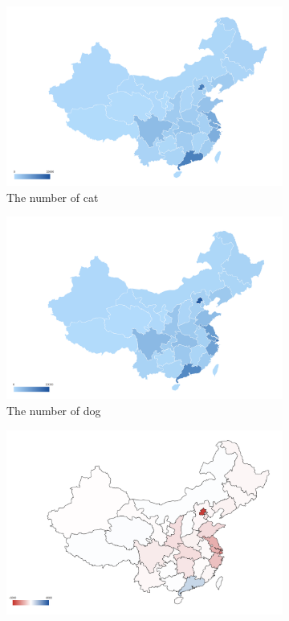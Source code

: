 \documentclass[12pt]{article}
\begin{document}
\begin{figure}[h!]
  \centering
  \begin{subfigure}[b]{0.3\linewidth}
    \includegraphics[width=\linewidth]{../Province/Cat_Province.png}
    \caption{The number of cat}
  \end{subfigure}
  \begin{subfigure}[b]{0.3\linewidth}
    \includegraphics[width=\linewidth]{../Province/Dog_Province.png}
    \caption{The number of dog}
  \end{subfigure}
  \begin{subfigure}[b]{0.3\linewidth}
  \includegraphics[width=\linewidth]{../Province/Diff_Province.png}

\end{subfigure}
\end{figure}
\end{document}
